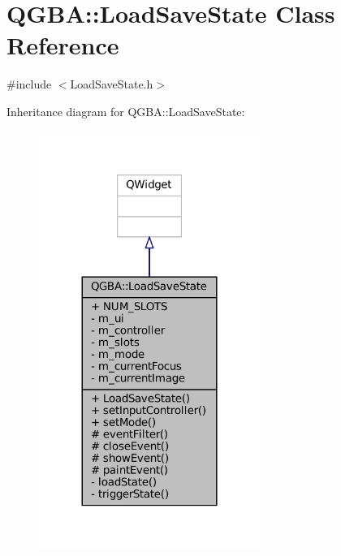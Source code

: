 \hypertarget{class_q_g_b_a_1_1_load_save_state}{}\section{Q\+G\+BA\+:\+:Load\+Save\+State Class Reference}
\label{class_q_g_b_a_1_1_load_save_state}


{\ttfamily \#include $<$Load\+Save\+State.\+h$>$}



Inheritance diagram for Q\+G\+BA\+:\+:Load\+Save\+State\+:
\nopagebreak
\begin{figure}[H]
\begin{center}
\leavevmode
\includegraphics[width=204pt]{class_q_g_b_a_1_1_load_save_state__inherit__graph}
\end{center}
\end{figure}


